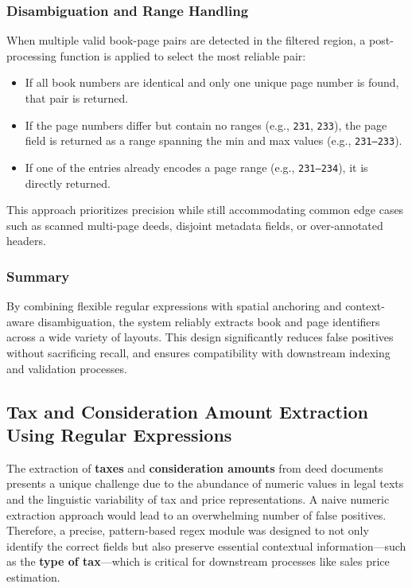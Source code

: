 \documentclass{article}
\begin{document}
\subsubsection{Disambiguation and Range Handling}

When multiple valid book-page pairs are detected in the filtered region, a post-processing function is applied to select the most reliable pair:

\begin{itemize}
    \item If all book numbers are identical and only one unique page number is found, that pair is returned.
    \item If the page numbers differ but contain no ranges (e.g., \texttt{231}, \texttt{233}), the page field is returned as a range spanning the min and max values (e.g., \texttt{231--233}).
    \item If one of the entries already encodes a page range (e.g., \texttt{231--234}), it is directly returned.
\end{itemize}

This approach prioritizes precision while still accommodating common edge cases such as scanned multi-page deeds, disjoint metadata fields, or over-annotated headers.

\subsubsection{Summary}

By combining flexible regular expressions with spatial anchoring and context-aware disambiguation, the system reliably extracts book and page identifiers across a wide variety of layouts. This design significantly reduces false positives without sacrificing recall, and ensures compatibility with downstream indexing and validation processes.

\subsection{Tax and Consideration Amount Extraction Using Regular Expressions}

The extraction of \textbf{taxes} and \textbf{consideration amounts} from deed documents presents a unique challenge due to the abundance of numeric values in legal texts and the linguistic variability of tax and price representations. A naive numeric extraction approach would lead to an overwhelming number of false positives. Therefore, a precise, pattern-based regex module was designed to not only identify the correct fields but also preserve essential contextual information---such as the \textbf{type of tax}---which is critical for downstream processes like sales price estimation.
\\
\end{document}
